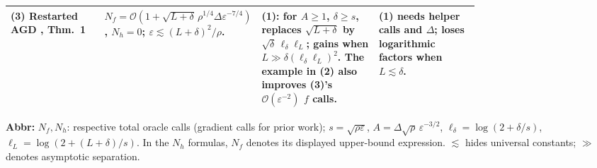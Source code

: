 \begin{table}[tp]
\begin{threeparttable}
\begin{tabularx}{\linewidth}{@{}>{\raggedright\arraybackslash}p{0.20\linewidth}>{\raggedright\arraybackslash}p{0.32\linewidth}>{\raggedright\arraybackslash}p{0.25\linewidth}>{\raggedright\arraybackslash}X@{}}
\midrule
\textbf{(3)} Restarted AGD \citep{asnLiLin2023}, Thm.~1 &
$N_f=\mathcal{O}(1+\sqrt{L+\delta}\,\rho^{1/4}\Delta\varepsilon^{-7/4})$, $N_h=0$; $\varepsilon\lesssim(L+\delta)^2/\rho$. &
\textbf{(1)}: for $A\geq1$, $\delta\geq s$, replaces $\sqrt{L+\delta}$ by $\sqrt\delta\,\ell_\delta\ell_L$; gains when $L\gg\delta(\ell_\delta\ell_L)^2$. The example in \textbf{(2)} also improves \textbf{(3)}'s $\mathcal{O}(\varepsilon^{-2})$ $f$ calls. &
\textbf{(1)} needs helper calls and $\Delta$; loses logarithmic factors when $L\lesssim\delta$. \\
\bottomrule
\end{tabularx}
\begin{tablenotes}[flushleft]\footnotesize
\item[] \textbf{Abbr:} $N_f,N_h$: respective total oracle calls (gradient calls for prior work); $s=\sqrt{\rho\varepsilon}$, $A=\Delta\sqrt\rho\,\varepsilon^{-3/2}$, $\ell_\delta=\log(2+\delta/s)$, $\ell_L=\log(2+(L+\delta)/s)$. In the $N_h$ formulas, $N_f$ denotes its displayed upper-bound expression. $\lesssim$ hides universal constants; $\gg$ denotes asymptotic separation.
\end{tablenotes}
\end{threeparttable}
\end{table}
\clearpage
